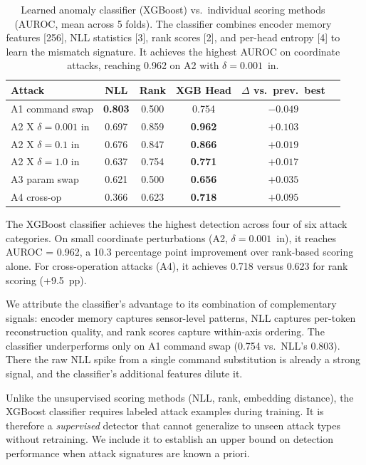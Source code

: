\begin{table}[t]
\centering
\caption{Learned anomaly classifier (XGBoost) vs.\ individual scoring methods (AUROC, mean across 5 folds). The classifier combines encoder memory features [256], NLL statistics [3], rank scores [2], and per-head entropy [4] to learn the mismatch signature. It achieves the highest AUROC on coordinate attacks, reaching 0.962 on A2 with $\delta = 0.001$~in.}
\label{tab:anomaly_head}
\small
\begin{tabular}{@{}lccccc@{}}
\toprule
Attack & NLL & Rank & XGB Head & $\Delta$ vs.\ prev.\ best \\
\midrule
A1 command swap & \textbf{0.803} & 0.500 & 0.754 & $-0.049$ \\
A2 X $\delta{=}0.001$ in & 0.697 & 0.859 & \textbf{0.962} & $+0.103$ \\
A2 X $\delta{=}0.1$ in & 0.676 & 0.847 & \textbf{0.866} & $+0.019$ \\
A2 X $\delta{=}1.0$ in & 0.637 & 0.754 & \textbf{0.771} & $+0.017$ \\
A3 param swap & 0.621 & 0.500 & \textbf{0.656} & $+0.035$ \\
A4 cross-op & 0.366 & 0.623 & \textbf{0.718} & $+0.095$ \\
\bottomrule
\end{tabular}
\end{table}

The XGBoost classifier achieves the highest detection across four of six attack categories.
On small coordinate perturbations (A2, $\delta = 0.001$~in), it reaches AUROC = 0.962, a 10.3 percentage point improvement over rank-based scoring alone.
For cross-operation attacks (A4), it achieves 0.718 versus 0.623 for rank scoring (+9.5~pp).

We attribute the classifier's advantage to its combination of complementary signals: encoder memory captures sensor-level patterns, NLL captures per-token reconstruction quality, and rank scores capture within-axis ordering.
The classifier underperforms only on A1 command swap (0.754 vs.\ NLL's 0.803).
There the raw NLL spike from a single command substitution is already a strong signal, and the classifier's additional features dilute it.

Unlike the unsupervised scoring methods (NLL, rank, embedding distance), the XGBoost classifier requires labeled attack examples during training.
It is therefore a \emph{supervised} detector that cannot generalize to unseen attack types without retraining.
We include it to establish an upper bound on detection performance when attack signatures are known a priori.

